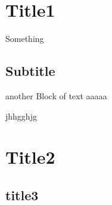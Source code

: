 
\section{Title1}
Something

\subsection{Subtitle}
another Block of text
aaaaa

jhhgghjg

\section{Title2}
\subsection{title3}

